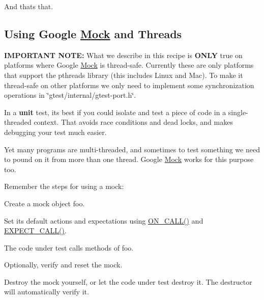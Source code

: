 And that\textquotesingle{}s that.

\subsection*{Using Google \hyperlink{class_mock}{Mock} and Threads}

{\bfseries I\+M\+P\+O\+R\+T\+A\+NT N\+O\+TE\+:} What we describe in this recipe is {\bfseries O\+N\+LY} true on platforms where Google \hyperlink{class_mock}{Mock} is thread-\/safe. Currently these are only platforms that support the pthreads library (this includes Linux and Mac). To make it thread-\/safe on other platforms we only need to implement some synchronization operations in {\ttfamily \char`\"{}gtest/internal/gtest-\/port.\+h\char`\"{}}.

In a {\bfseries unit} test, it\textquotesingle{}s best if you could isolate and test a piece of code in a single-\/threaded context. That avoids race conditions and dead locks, and makes debugging your test much easier.

Yet many programs are multi-\/threaded, and sometimes to test something we need to pound on it from more than one thread. Google \hyperlink{class_mock}{Mock} works for this purpose too.

Remember the steps for using a mock\+:


\begin{DoxyEnumerate}
\item Create a mock object {\ttfamily foo}.
\end{DoxyEnumerate}
\begin{DoxyEnumerate}
\item Set its default actions and expectations using {\ttfamily \hyperlink{gmock-spec-builders_8h_a5b12ae6cf84f0a544ca811b380c37334}{O\+N\+\_\+\+C\+A\+L\+L()}} and {\ttfamily \hyperlink{gmock-spec-builders_8h_a535a6156de72c1a2e25a127e38ee5232}{E\+X\+P\+E\+C\+T\+\_\+\+C\+A\+L\+L()}}.
\end{DoxyEnumerate}
\begin{DoxyEnumerate}
\item The code under test calls methods of {\ttfamily foo}.
\end{DoxyEnumerate}
\begin{DoxyEnumerate}
\item Optionally, verify and reset the mock.
\end{DoxyEnumerate}
\begin{DoxyEnumerate}
\item Destroy the mock yourself, or let the code under test destroy it. The destructor will automatically verify it.
\end{DoxyEnumerate}

